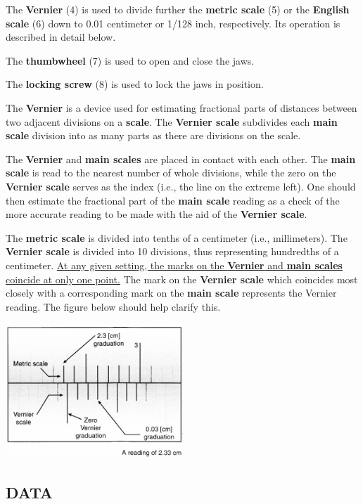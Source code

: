 The \textbf{Vernier} (4) is used to divide further the \textbf{metric scale} (5) or the \textbf{English scale} (6) down to 0.01 centimeter or 1/128 inch, respectively.  Its operation is described in detail below.

The \textbf{thumbwheel} (7) is used to open and close the jaws.

The \textbf{locking screw} (8) is used to lock the jaws in position.

The \textbf{Vernier} is a device used for estimating fractional parts of distances between two adjacent divisions on a \textbf{scale}.  The \textbf{Vernier scale} subdivides each \textbf{main scale} division into as many parts as there are divisions on the scale.

The \textbf{Vernier} and \textbf{main scales} are placed in contact with each other.  The \textbf{main scale} is read to the nearest number of whole divisions, while the zero on the \textbf{Vernier scale} serves as the index (i.e., the line on the extreme left).  One should then estimate the fractional part of the \textbf{main scale} reading as a check of the more accurate reading to be made with the aid of the \textbf{Vernier scale}.

The \textbf{metric scale} is divided into tenths of a centimeter (i.e., millimeters).  The \textbf{Vernier scale} is divided into 10 divisions, thus representing hundredths of a centimeter.  \ul{At any given setting, the marks on the \textbf{Vernier} and \textbf{main scales} coincide at only one point.}  The mark on the \textbf{Vernier scale} which coincides most closely with a corresponding mark on the \textbf{main scale} represents the Vernier reading.  The figure below should help clarify this.
\begin{center} \includegraphics*[width=0.5\textwidth]{imgs/6labs/6Alab/6Aexp2/caliper_alt_2.jpg} \end{center}

\subsection*{DATA}

